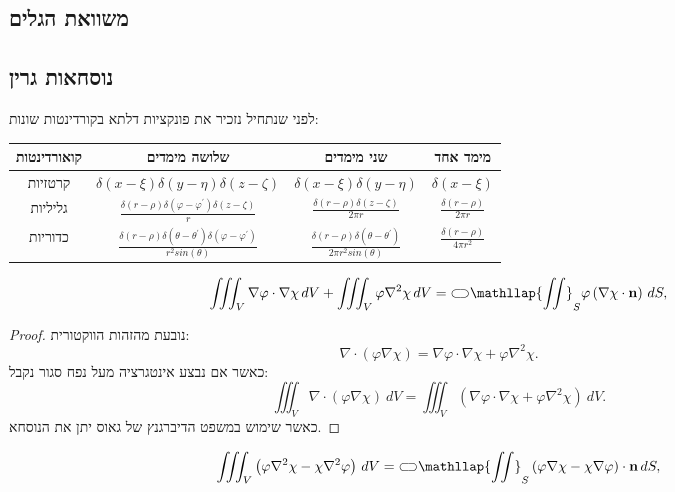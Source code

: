\documentclass{tstextbook}
\begin{document}
\subsection{משוואת הגלים}

\subsection{נוסחאות גרין}

לפני שנתחיל נזכיר את פונקציות דלתא בקורדינטות שונות:

\begin{table}[htbp]
  \centering
  \begin{tabular}{|cccc|}
    \hline
    קואורדינטות & שלושה מימדים & שני מימדים & מימד אחד \\ \hline
    קרטזיות & \(\delta(x-\xi)\delta(y-\eta)\delta(z-\zeta)\) & \(\delta(x-\xi)\delta(y-\eta)\) & \(\delta(x-\xi)\) \\ \hline
    גליליות & \(\frac{\delta(r-\rho)\delta(\varphi-\varphi^{\prime})\delta(z-\zeta)}{r}\) & \(\frac{\delta(r-\rho)\delta(z-\zeta)}{2\pi r}\) & \(\frac{\delta(r-\rho)}{2\pi r}\) \\ \hline
    כדוריות & \(\frac{\delta(r-\rho)\delta(\theta-\theta^{\prime})\delta(\varphi-\varphi^{\prime})}{r^{2}sin(\theta)}\) & \(\frac{\delta(r-\rho)\delta(\theta-\theta^{\prime})}{2\pi r^{2}sin(\theta)}\) & \(\frac{\delta(r-\rho)}{4\pi r^{2}}\) \\ \hline
  \end{tabular}
\end{table}
\begin{proposition}
$$\iiint_{V}\nabla\varphi\cdot\nabla\chi\,d V+\iiint_{V}\varphi\nabla^{2}\chi\,d V={\subset\!\supset} \mathllap{\iint}_{S}\varphi\left( \nabla\chi\cdot\mathbf{n} \right)\,d S,$$

\end{proposition}
\begin{proof}
נובעת מהזהות הווקטורית:
$$\nabla\cdot(\varphi\nabla\chi)=\nabla\varphi\cdot\nabla\chi+\varphi\nabla^{2}\chi.$$
כאשר אם נבצע אינטגרציה מעל נפח סגור נקבל:
$$\iiint_{V}\nabla\cdot(\varphi\nabla\chi)\ d V=\iiint_{V}\left(\nabla\varphi\cdot\nabla\chi+\varphi\nabla^{2}\chi\right)\ d V.$$
כאשר שימוש במשפט הדיברגנץ של גאוס יתן את הנוסחא.

\end{proof}
\begin{proposition}
$$\iiint_{V}\left(\varphi\nabla^{2}\chi-\chi\nabla^{2}\varphi\right)\,d V={\subset\!\supset} \mathllap{\iint}_{S}\left(\varphi\nabla\chi-\chi\nabla\varphi\right)\cdot\mathbf{n}\,d S,
$$

\end{proposition}
\end{document}
